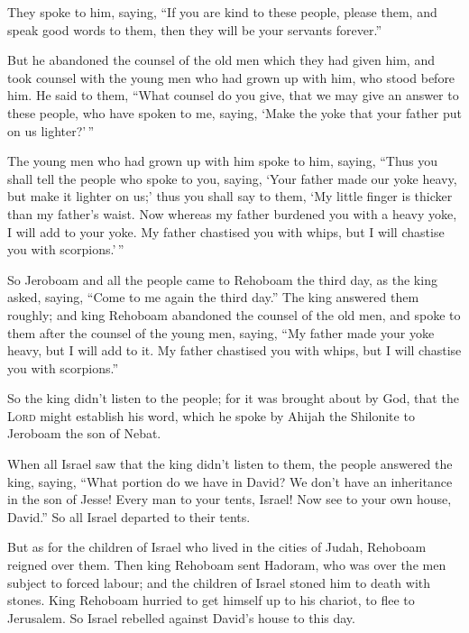  They spoke to him, saying, ``If you are kind to these
people, please them, and speak good words to them, then they will be
your servants forever.''

 But he abandoned the counsel of the old men which they
had given him, and took counsel with the young men who had grown up with
him, who stood before him.  He said to them, ``What
counsel do you give, that we may give an answer to these people, who
have spoken to me, saying, `Make the yoke that your father put on us
lighter?'\,''

 The young men who had grown up with him spoke to him,
saying, ``Thus you shall tell the people who spoke to you, saying, `Your
father made our yoke heavy, but make it lighter on us;' thus you shall
say to them, `My little finger is thicker than my father's waist.
 Now whereas my father burdened you with a heavy yoke, I
will add to your yoke. My father chastised you with whips, but I will
chastise you with scorpions.'\,''

 So Jeroboam and all the people came to Rehoboam the
third day, as the king asked, saying, ``Come to me again the third
day.''  The king answered them roughly; and king Rehoboam
abandoned the counsel of the old men,  and spoke to them
after the counsel of the young men, saying, ``My father made your yoke
heavy, but I will add to it. My father chastised you with whips, but I
will chastise you with scorpions.''

 So the king didn't listen to the people; for it was
brought about by God, that the \textsc{Lord} might establish his word,
which he spoke by Ahijah the Shilonite to Jeroboam the son of Nebat.

 When all Israel saw that the king didn't listen to them,
the people answered the king, saying, ``What portion do we have in
David? We don't have an inheritance in the son of Jesse! Every man to
your tents, Israel! Now see to your own house, David.'' So all Israel
departed to their tents.

 But as for the children of Israel who lived in the
cities of Judah, Rehoboam reigned over them.  Then king
Rehoboam sent Hadoram, who was over the men subject to forced labour;
and the children of Israel stoned him to death with stones. King
Rehoboam hurried to get himself up to his chariot, to flee to Jerusalem.
 So Israel rebelled against David's house to this day.

